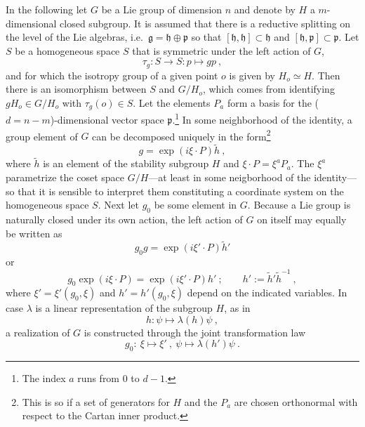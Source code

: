 \documentclass[11pt]{article}
\begin{document}
In the following let $G$ be a Lie group of dimension $n$ and 
denote by $H$ a $m$-dimensional closed subgroup. It is assumed 
that there is a reductive splitting on the level of the Lie 
algebras, i.e.~$\mathfrak{g} = \mathfrak{h} \oplus \mathfrak{p}$ 
so that $[\mathfrak{h},\mathfrak{h}] \subset \mathfrak{h}$ and 
$[\mathfrak{h},\mathfrak{p}] \subset \mathfrak{p}$.  Let $S$ be a 
homogeneous space $S$ that is symmetric under the left action of 
$G$,
\begin{equation}
	\tau_g : S \to S : p \mapsto gp~,
\end{equation}
and for which the isotropy group of a given point $o$ is given by 
$H_o \simeq H$. Then there is an isomorphism between $S$ and 
$G/H_o$, which comes from identifying $gH_o \in G/H_o$ with 
$\tau_g(o) \in S$. Let the elements $P_a$ form a basis for the 
($d = n - m$)-dimensional vector space 
$\mathfrak{p}$.\footnote{The index $a$ runs from $0$ to $d-1$.}
In some neighborhood of the identity, a group element of $G$ can 
be decomposed uniquely in the form\footnote{This is so if a set 
	of generators for $H$ and the $P_a$ are chosen orthonormal 
	with respect to the Cartan inner product.}
\begin{displaymath}
	g = \exp(i\xi\cdot P) \tilde{h}~,
\end{displaymath}
where $\tilde{h}$ is an element of the stability subgroup $H$ and 
$\xi\cdot P = \xi^a P_a$.  The $\xi^a$ parametrize the coset 
space $G/H$---at least in some neigborhood of the identity---so 
that it is sensible to interpret them constituting a coordinate 
system on the homogeneous space $S$. Next let $g_0$ be some 
element in $G$.  Because a Lie group is naturally closed under 
its own action, the left action of $G$ on itself may equally be 
written as
\begin{displaymath}
	g_0 g = \exp(i\xi'\cdot P)\tilde{h}'
\end{displaymath}
or
\begin{equation}\label{eq:left_action_group}
	g_0 \exp(i\xi\cdot P) = \exp(i\xi'\cdot P)h'~;
	\qquad
	h' := \tilde{h}'\tilde{h}^{-1}~,
\end{equation}
where $\xi'=\xi'(g_0,\xi)$ and $h'=h'(g_0,\xi)$ depend on the 
indicated variables. In case $\lambda$ is a linear representation 
of the subgroup $H$, as in
\begin{displaymath}
	h: \psi \mapsto \lambda(h)\psi~,
\end{displaymath}
a realization of $G$ is constructed through the joint 
transformation law
\begin{equation}\label{eq:nonlin_real}
	g_0 :~\xi \mapsto \xi'~,~\psi \mapsto \lambda(h')\psi~.
\end{equation}
\end{document}
